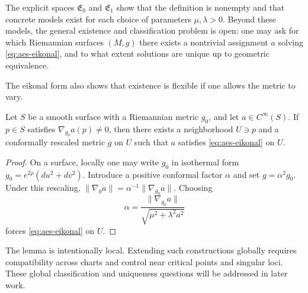 The explicit spaces $\mathfrak{E}_0$ and $\mathfrak{E}_1$ show that the definition is nonempty and that concrete models exist for each choice of parameters $\mu,\lambda>0$. Beyond these models, the general existence and classification problem is open: one may ask for which Riemannian surfaces $(M,g)$ there exists a nontrivial assignment $a$ solving \eqref{eq:aes-eikonal}, and to what extent solutions are unique up to geometric equivalence.

The eikonal form also shows that existence is flexible if one allows the metric to vary.

\begin{lemma}\label{lemma:aes-local-rectification}
Let $S$ be a smooth surface with a Riemannian metric $g_0$, and let $a\in C^{\infty}(S)$. If $p\in S$ satisfies $\nabla_{g_0}a(p)\neq 0$, then there exists a neighborhood $U\ni p$ and a conformally rescaled metric $g$ on $U$ such that $a$ satisfies \eqref{eq:aes-eikonal} on $U$.
\end{lemma}

\begin{proof}
On a surface, locally one may write $g_0$ in isothermal form $g_0=e^{2\rho}(du^2+dv^2)$. Introduce a positive conformal factor $\alpha$ and set $g=\alpha^2 g_0$. Under this rescaling, $\|\nabla_g a\|=\alpha^{-1}\|\nabla_{g_0}a\|$. Choosing
\[
\alpha=\frac{\|\nabla_{g_0}a\|}{\sqrt{\mu^2+\lambda^2 a^2}}
\]
forces \eqref{eq:aes-eikonal} on $U$.
\end{proof}

The lemma is intentionally local. Extending such constructions globally requires compatibility across charts and control near critical points and singular loci. These global classification and uniqueness questions will be addressed in later work.
